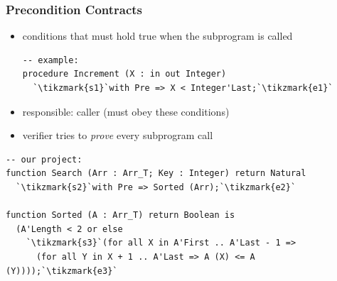 \begin{frame}[fragile]
  \frametitle{Precondition Contracts}
  \begin{itemize}
  \item conditions that must hold true when the subprogram is called
\begin{lstlisting}[escapechar=\`]
-- example:
procedure Increment (X : in out Integer) 
  `\tikzmark{s1}`with Pre => X < Integer'Last;`\tikzmark{e1}`
\end{lstlisting}
  \item responsible: caller (must obey these conditions)
  \item verifier tries to \emph{prove} every subprogram call
  \end{itemize}

\begin{lstlisting}[escapechar=\`]
-- our project:
function Search (Arr : Arr_T; Key : Integer) return Natural
  `\tikzmark{s2}`with Pre => Sorted (Arr);`\tikzmark{e2}`

function Sorted (A : Arr_T) return Boolean is 
  (A'Length < 2 or else
    `\tikzmark{s3}`(for all X in A'First .. A'Last - 1 =>
      (for all Y in X + 1 .. A'Last => A (X) <= A (Y))));`\tikzmark{e3}`
\end{lstlisting}%
\end{frame}
\addtocounter{clock}{2}


